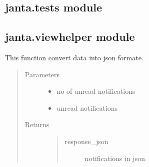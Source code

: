 \documentclass[letterpaper,10pt,english]{sphinxmanual}
\begin{document}
\subsection{janta.tests module}
\label{\detokenize{janta:module-janta.tests}}\label{\detokenize{janta:janta-tests-module}}

\subsection{janta.viewhelper module}
\label{\detokenize{janta:module-janta.viewhelper}}\label{\detokenize{janta:janta-viewhelper-module}}

\begin{fulllineitems}
\label{\detokenize{janta:janta.viewhelper.convert_to_json}}
This function convert data into json formate.
\begin{quote}\begin{description}
\item[{Parameters}] \leavevmode\begin{itemize}
\item {} 
 \textendash{} no of unread notifications

\item {} 
 \textendash{} unread notifications

\end{itemize}

\item[{Returns}] \leavevmode
\begin{quote}\begin{description}
\item[{response\_json}] \leavevmode
notifications in json

\end{description}\end{quote}


\end{description}\end{quote}

\end{fulllineitems}
\end{document}
